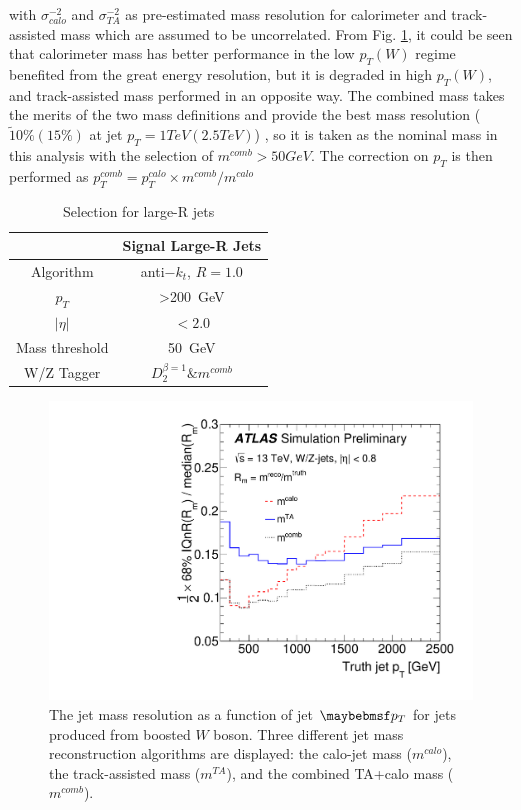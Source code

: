 with $\sigma_{{calo}}^{-2}$ and $\sigma_{{TA}}^{-2}$ as pre-estimated mass resolution for calorimeter and track-assisted mass which are assumed to be uncorrelated. From Fig. \ref{Fig:combinedmassperformance}, it could be seen that calorimeter mass has better performance in the low $p_{T}(W)$ regime benefited from the great energy resolution, but it is degraded in high $p_{T}(W)$, and track-assisted mass performed in an opposite way. The combined mass takes the merits of the two mass definitions and provide the best mass resolution ($\tilde 10\% (15\%)$ at jet $p_{T}=1TeV(2.5TeV)$) , so it is taken as the nominal mass in this analysis with the selection of $m^{comb}>50GeV$. The correction on $p_{T}$ is then performed as $p_{T}^{comb}=p_{T}^{calo}\times m^{comb}/m^{calo}$ 

\begin{table}[h]
	\caption{Selection for large-R jets}\label{Tab:Jdefinit}
	\vspace{2.0em}
	\centering
	\begin{tabular}{|c||c|}
		\hline
		& Signal Large-R Jets\\
		\hline
		Algorithm & anti$-k_t$, $R=1.0$\\
		$p_{T}$   & >200~GeV\\
		$| \eta |$      & $< 2.0 $\\
		Mass threshold  & 50~GeV\\
		W/Z Tagger &  $D^{\beta =1}_2 \& m^{comb}$ \\
		\hline
	\end{tabular}
\end{table}
\begin{figure}[ht]
	\begin{center}
		\includegraphics[width=0.6\hsize]{Chapter3/mass_resolution}
		\caption{The jet mass resolution as a function of jet $\p_{T}$ for jets produced from boosted $W$ boson\cite{ATLAS-CONF-2016-035}. Three different jet mass reconstruction algorithms are displayed: the calo-jet mass ($m^{{calo}}$), the track-assisted mass ($m^{{TA}}$), and the combined TA+calo mass ($m^{{comb}}$).}
		\label{Fig:combinedmassperformance}
	\end{center}
\end{figure}
